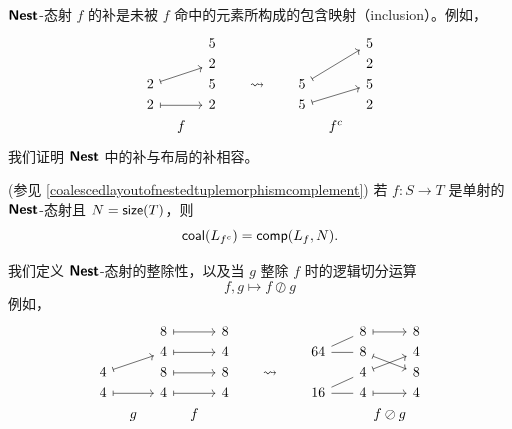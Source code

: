 ${\boldsymbol{\mathsf{Nest}}}$-态射 $f$ 的补是未被 $f$ 命中的元素所构成的包含映射（inclusion）。例如，
\[\begin{tikzcd}[row sep = 1, column sep = 8]
 & & 5 & & & & & & 5\\
 & & 2 & & & & & & 2\\
 2 \ar[urr,mapsto] & & 5 & & \rightsquigarrow &  & 5 \ar[uurr,mapsto] & & 5\\
 2 \ar[rr,mapsto] & & 2 & & & &  5 \ar[urr,mapsto]  & & 2\\
    & f & & & & & &  f^c &
\end{tikzcd}\]
我们证明 ${\boldsymbol{\mathsf{Nest}}}$ 中的补与布局的补相容。
\begin{mainthm}(参见 \ref{coalescedlayoutofnestedtuplemorphismcomplement}) 若 $f:S \to T$ 是单射的 ${\boldsymbol{\mathsf{Nest}}}$-态射且 $N = \mathsf{size}(T)$，则
\[
\mathsf{coal}(L_{f^c}) = \mathsf{comp}(L_f,N).
\]
\end{mainthm}

我们定义 ${\boldsymbol{\mathsf{Nest}}}$-态射的整除性，以及当 $g$ 整除 $f$ 时的逻辑切分运算
\[
f,g \mapsto f \oslash g
\]
例如，
\[\begin{tikzcd}[row sep = 1, column sep = 8]
  & & 8 \ar[rr,mapsto] & & 8 & & & & & &  8 \ar[rr,mapsto]  & & 8\\
  & & 4 \ar[rr,mapsto] & & 4 & & & & 64 \ar[rr,-] \ar[urr,-]& &  8 \ar[drr,mapsto] & & 4\\
4 \ar[urr,mapsto] & & 8 \ar[rr,mapsto] & & 8 & & \rightsquigarrow & &  & &  4 \ar[urr,mapsto] & & 8\\
4 \ar[rr,mapsto] & & 4 \ar[rr,mapsto] & & 4 & & & & 16 \ar[rr,-] \ar[urr,-]& & 4 \ar[rr,mapsto] & & 4\\
  & g &  & f & & & & & & & & \mathclap{f \oslash g} &
\end{tikzcd}\]

